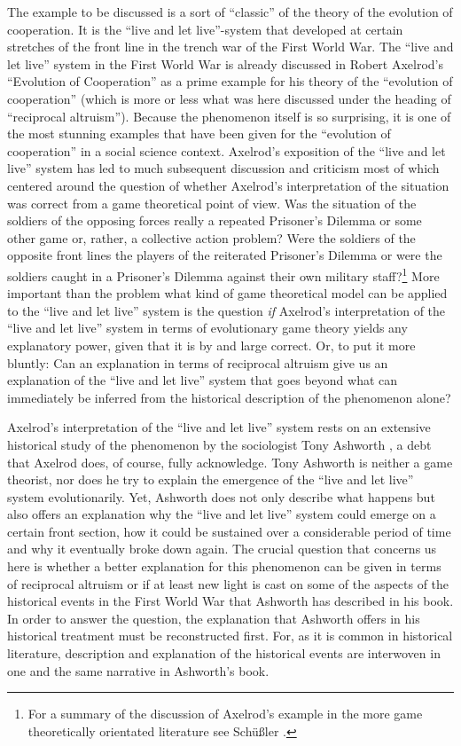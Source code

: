 The example to be discussed is a sort of ``classic'' of the theory of the
evolution of cooperation. It is the ``live and let live''-system that
developed at certain stretches of the front line in the trench war of the
First World War. The ``live and let live'' system in the First World War is
already discussed in Robert Axelrod's ``Evolution of Cooperation'' as a prime
example for his theory of the ``evolution of cooperation'' (which is more or
less what was here discussed under the heading of ``reciprocal altruism'').
Because the phenomenon itself is so surprising, it is one of the most stunning
examples that have been given for the ``evolution of cooperation'' in a social
science context.  Axelrod's exposition of the ``live and let live'' system has
led to much subsequent discussion and criticism most of which centered around
the question of whether Axelrod's interpretation of the situation was correct
from a game theoretical point of view. Was the situation of the soldiers of
the opposing forces really a repeated Prisoner's Dilemma or some other game
or, rather, a collective action problem? Were the soldiers of the opposite
front lines the players of the reiterated Prisoner's Dilemma or were the
soldiers caught in a Prisoner's Dilemma against their own military
staff?\footnote{For a summary of the discussion of Axelrod's example in the
  more game theoretically orientated literature see Schüßler \cite[p.
  33ff.]{schuessler:1997}.} More important than the problem what kind of game
theoretical model can be applied to the ``live and let live'' system is the
question {\em if} Axelrod's interpretation of the ``live and let live'' system
in terms of evolutionary game theory yields any explanatory power, given that
it is by and large correct. Or, to put it more bluntly: Can an explanation in
terms of reciprocal altruism give us an explanation of the ``live and let
live'' system that goes beyond what can immediately be inferred from the
historical description of the phenomenon alone?

Axelrod's interpretation of the ``live and let live'' system rests on an
extensive historical study of the phenomenon by the sociologist Tony Ashworth
\cite[]{ashworth:1980}, a debt that Axelrod does, of course, fully acknowledge.
Tony Ashworth is neither a game theorist, nor does he try to explain the
emergence of the ``live and let live'' system evolutionarily. Yet, Ashworth
does not only describe what happens but also offers an explanation why the
``live and let live'' system could emerge on a certain front section, how it
could be sustained over a considerable period of time and why it eventually
broke down again. The crucial question that concerns us here is whether a
better explanation for this phenomenon can be given in terms of
reciprocal altruism or if at least new light is cast on some of the aspects
of the historical events in the First World War that Ashworth has described in
his book. In order to answer the question, the explanation that Ashworth
offers in his historical treatment must be reconstructed first. For, as it is
common in historical literature, description and explanation of the historical
events are interwoven in one and the same narrative in Ashworth's book.

